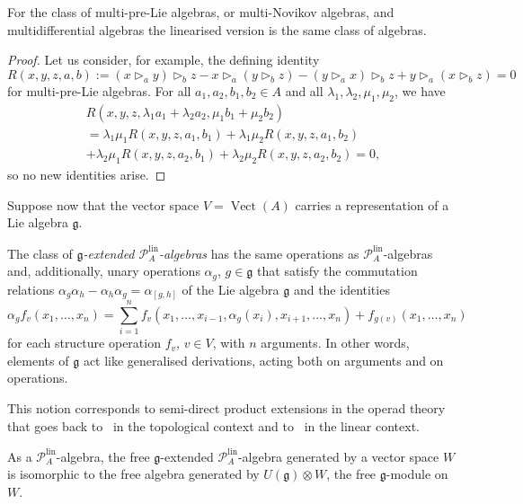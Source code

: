 \documentclass[AHL,Unicode,longabstracts]{cedram}
\newcommand{\cP}{\mathcal{P}}
\newcommand*\fkg{\mathfrak{g}}
\newcommand{\linn}{\mathrm{lin}}
\DeclareMathOperator{\Vect}{Vect}
\begin{document}
\begin{prop}\label{linearised_Novikov}
For the class of multi-pre-Lie algebras, or multi-Novikov algebras, and multidifferential algebras the linearised version is the same class of algebras.
\end{prop}

\begin{proof}
Let us consider, for example, the defining identity
\[
R(x,y,z,a,b):=(x \triangleright_a y) \triangleright_b z - x \triangleright_a (y \triangleright_b z) - (y \triangleright_a x) \triangleright_b z + y \triangleright_a (x \triangleright_b z)=0
\]
for multi-pre-Lie algebras. For all $a_1,a_2,b_1,b_2\in A$ and all $\lambda_1,\lambda_2,\mu_1,\mu_2$, we have
\begin{multline}
R(x,y,z,\lambda_1a_1+\lambda_2a_2,\mu_1b_1+\mu_2b_2)\\
=\lambda_1\mu_1R(x,y,z,a_1,b_1)+\lambda_1\mu_2R(x,y,z,a_1,b_2)\\
+\lambda_2\mu_1R(x,y,z,a_2,b_1)+\lambda_2\mu_2R(x,y,z,a_2,b_2)=0,
\end{multline}
so no new identities arise.
\end{proof}

Suppose now that the vector space $V=\Vect(A)$ carries a representation of a Lie algebra $\fkg$.

\begin{defi}\label{def_action_g}
The class of \emph{$\fkg$-extended $\cP_A^{\linn}$-algebras} has the same operations as $\cP_A^{\linn}$-algebras and, additionally, unary operations $\alpha_g$, $g\in\fkg$ that satisfy the commutation relations $\alpha_g\alpha_h-\alpha_h\alpha_g=\alpha_{[g,h]}$ of the Lie algebra $\fkg$ and the identities
\[
\alpha_g f_v(x_1,\dots,x_n)=\sum_{i=1}^n f_v(x_1,\dots,x_{i-1},\alpha_g(x_i),x_{i+1},\dots,x_n)+f_{g(v)}(x_1,\dots,x_n)
\]
for each structure operation $f_v$, $v\in V$, with $n$ arguments. In other words, elements of $\fkg$ act like generalised derivations, acting both on arguments and on operations.
\end{defi}

This notion corresponds to semi-direct product extensions in the operad theory that goes back to~\cite{Markl} in the topological context and to~\cite{Bel} in the linear context.

\begin{prop}\label{prop:extlin}
As a $\cP_A^{\linn}$-algebra, the free $\fkg$-extended $\cP_A^{\linn}$-algebra generated by a vector space $W$ is isomorphic to the free algebra generated by $U(\fkg)\otimes W$, the free $\fkg$-module on $W$.
\end{prop}
\end{document}

